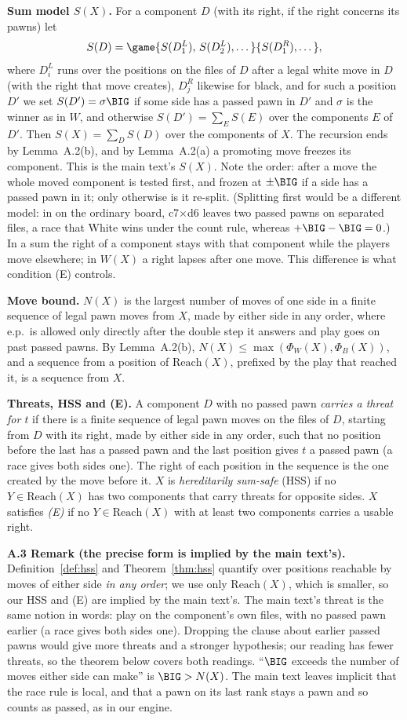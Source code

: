 \textbf{Sum model $S(X)$.} For a component $D$ (with its right, if the right concerns its pawns) let
\[
S(D)=\game{S(D^L_1),\,S(D^L_2),\dots}{S(D^R_1),\dots},
\]
where $D^L_i$ runs over the positions on the files of $D$ after a legal white move in $D$ (with the right that move
creates), $D^R_j$ likewise for black, and for such a position $D'$ we set $S(D')=\sigma\BIG$ if some side has a passed pawn
in $D'$ and $\sigma$ is the winner as in $W$, and otherwise $S(D')=\sum_E S(E)$ over the components $E$ of $D'$. Then
$S(X)=\sum_D S(D)$ over the components of $X$. The recursion ends by Lemma~A.2(b), and by Lemma~A.2(a) a promoting move
freezes its component. This is the main text's $S(X)$. Note the order: after a move the whole moved component is tested first, and
frozen at $\pm\BIG$ if a side has a passed pawn in it; only otherwise is it re-split. (Splitting first would be a different model: in  on the ordinary board, c7$\times$d6 leaves two passed pawns on separated files, a race that White wins under the count rule, whereas $+\BIG-\BIG=0$.) In a sum the right of a component
stays with that component while the players move elsewhere; in $W(X)$ a right lapses after one move. This difference is
what condition (E) controls.

\textbf{Move bound.} $N(X)$ is the largest number of moves of one side in a finite sequence of legal pawn moves from $X$,
made by either side in any order, where e.p.\ is allowed only directly after the double step it answers and play goes on
past passed pawns. By Lemma~A.2(b), $N(X)\le\max(\Phi_W(X),\Phi_B(X))$, and a sequence from a position of
$\mathrm{Reach}(X)$, prefixed by the play that reached it, is a sequence from $X$.

\textbf{Threats, HSS and (E).} A component $D$ with no passed pawn \emph{carries a threat for $t$} if there is a finite
sequence of legal pawn moves on the files of $D$, starting from $D$ with its right, made by either side in any order, such
that no position before the last has a passed pawn and the last position gives $t$ a passed pawn (a race gives both sides
one). The right of each position in the sequence is the one created by the move before it.
$X$ is \emph{hereditarily sum-safe} (HSS) if no $Y\in\mathrm{Reach}(X)$ has two components that carry threats for opposite
sides. $X$ satisfies \emph{(E)} if no $Y\in\mathrm{Reach}(X)$ with at least two components carries a usable right.

\textbf{A.3 Remark (the precise form is implied by the main text's).} Definition~\ref{def:hss} and Theorem~\ref{thm:hss}
quantify over positions reachable by moves of either side \emph{in any order}; we use only $\mathrm{Reach}(X)$, which is
smaller, so our HSS and (E) are implied by the main text's. The main text's threat is the same notion in words: play on the component's own files, with no passed
pawn earlier (a race gives both sides one). Dropping the clause about earlier passed pawns would give more threats and a stronger
hypothesis; our reading has fewer threats, so the theorem below covers both readings. ``$\BIG$ exceeds the number of moves either side can make'' is $\BIG>N(X)$. The main
text leaves implicit that the race rule is local, and that a pawn on its last rank stays a pawn and so counts as passed, as in our engine.


